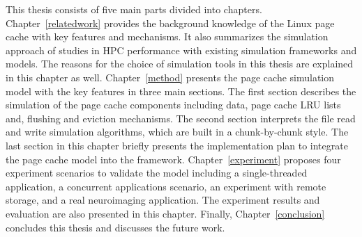 This thesis consists of five main parts divided into chapters.
Chapter~\ref{relatedwork} provides the background knowledge of the Linux 
page cache with key features and mechanisms. 
It also summarizes the simulation approach of studies in HPC performance with 
existing simulation frameworks and models. 
The reasons for the choice of simulation tools in this thesis are explained in this 
chapter as well.
Chapter~\ref{method} presents the page cache simulation model with the key features 
in three main sections.
The first section describes the simulation of the page cache components 
including data, page cache LRU lists and, flushing and eviction mechanisms.
The second section interprets the file read and write simulation algorithms, 
which are built in a chunk-by-chunk style.
The last section in this chapter briefly presents the implementation plan to integrate 
the page cache model into the \wrench framework.
Chapter~\ref{experiment} proposes four experiment scenarios to validate the model
including a single-threaded application, a concurrent applications scenario, 
an experiment with remote storage, and a real neuroimaging application. 
The experiment results and evaluation are also presented in this chapter. 
Finally, Chapter~\ref{conclusion} concludes this thesis and discusses the future work. 

